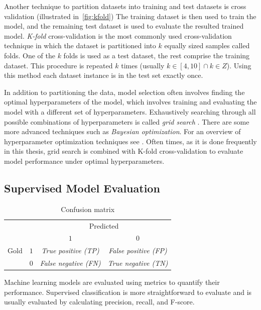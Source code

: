 Another technique to partition datasets into training and test datasets
is cross validation \citep{arlot2010survey} (illustrated in~\ref{fig:kfold})
The training dataset is then used to train the model, and the remaining
test dataset is used to evaluate the resulted trained model. 
\textit{K-fold} cross-validation is the most commonly used
cross-validation technique in which the dataset is partitioned into 
$k$ equally sized samples called folds. One of the $k$ folds is
used as a test dataset, the rest comprise the training dataset. This
procedure is repeated $k$ times (usually $k \in [4, 10] \cap k \in Z$).
Using this method each dataset instance is in the test set 
exactly once.

In addition to partitioning the data, model selection often involves finding
the optimal hyperparameters of the model, which involves  training and
evaluating the model with a different set of hyperparameters.  Exhaustively
searching through all possible combinations of hyperparameters is called
\textit{grid search} \citep{bergstra2012random}. There are some more advanced
techniques such as \textit{Bayesian optimization}.  For an overview of
hyperparameter optimization techniques see \citep{snoek2012practical}.
Often times, as it is done frequently in this thesis, grid search is combined 
with K-fold cross-validation to evaluate model performance under optimal
hyperparameters. 

\subsection{Supervised Model Evaluation}
\label{sec:metrics}

\begin{table}[t]
	\centering
	\begin{tabular}{c c|c c}
	\toprule
	& & \multicolumn{2}{c}{Predicted} \\
	\multirow{4}{*}{Gold} & & $1$ & $0$ \\ \hline
	& $1$ & \textit{True positive (TP)} & \textit{False positive (FP)} \\
		& $0$ & \textit{False negative (FN)} & \textit{True negative (TN)} \\
	\bottomrule
\end{tabular}
	\caption{Confusion matrix}
	\label{tab:conf_mat}
\end{table}

Machine learning models are evaluated using metrics to quantify their
performance. Supervised classification is more straightforward to evaluate and
is usually evaluated by calculating precision, recall, and F-score. 

